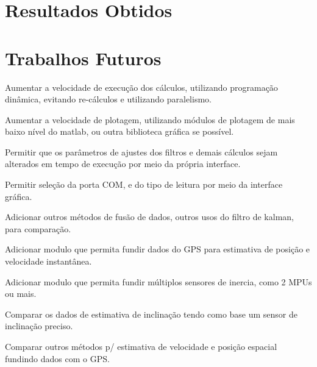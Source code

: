 \section{Resultados Obtidos}
\section{Trabalhos Futuros}
Aumentar a velocidade de execução dos cálculos, utilizando programação dinâmica, evitando re-cálculos e utilizando paralelismo.

Aumentar a velocidade de plotagem, utilizando módulos de plotagem de mais baixo nível do matlab, ou outra biblioteca gráfica se possível.

Permitir que os parâmetros de ajustes dos filtros e demais cálculos sejam alterados em tempo de execução por meio da própria interface.

Permitir seleção da porta COM, e do tipo de leitura por meio da interface gráfica.

Adicionar outros métodos de fusão de dados, outros usos do filtro de kalman, para comparação.

Adicionar modulo que permita fundir dados do GPS para estimativa de posição e velocidade instantânea.

Adicionar modulo que permita fundir múltiplos sensores de inercia, como 2 MPUs ou mais.

Comparar os dados de estimativa de inclinação tendo como base um sensor de inclinação preciso.

Comparar outros métodos p/ estimativa de velocidade e posição espacial fundindo dados com o \acrshort{GPS}.

